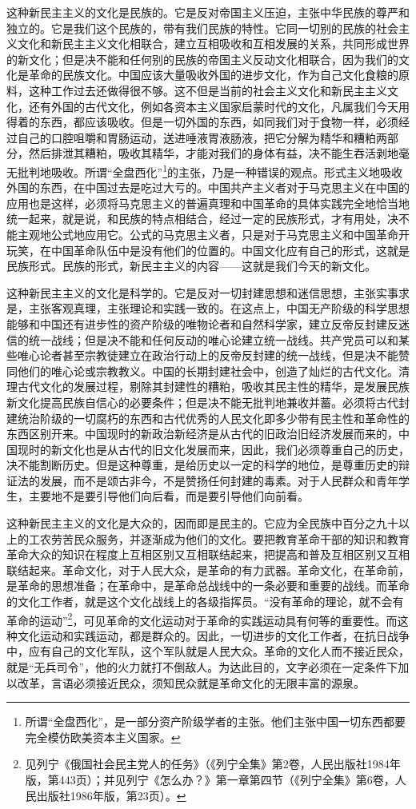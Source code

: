 \documentclass[UTF8, 12pt, a4paper]{ctexrep}
\begin{document}
这种新民主主义的文化是民族的。它是反对帝国主义压迫，主张中华民族的尊严和独立的。它是我们这个民族的，带有我们民族的特性。它同一切别的民族的社会主义文化和新民主主义文化相联合，建立互相吸收和互相发展的关系，共同形成世界的新文化；但是决不能和任何别的民族的帝国主义反动文化相联合，因为我们的文化是革命的民族文化。中国应该大量吸收外国的进步文化，作为自己文化食粮的原料，这种工作过去还做得很不够。这不但是当前的社会主义文化和新民主主义文化，还有外国的古代文化，例如各资本主义国家启蒙时代的文化，凡属我们今天用得着的东西，都应该吸收。但是一切外国的东西，如同我们对于食物一样，必须经过自己的口腔咀嚼和胃肠运动，送进唾液胃液肠液，把它分解为精华和糟粕两部分，然后排泄其糟粕，吸收其精华，才能对我们的身体有益，决不能生吞活剥地毫无批判地吸收。所谓“全盘西化”\footnote{所谓“全盘西化”，是一部分资产阶级学者的主张。他们主张中国一切东西都要完全模仿欧美资本主义国家。}的主张，乃是一种错误的观点。形式主义地吸收外国的东西，在中国过去是吃过大亏的。中国共产主义者对于马克思主义在中国的应用也是这样，必须将马克思主义的普遍真理和中国革命的具体实践完全地恰当地统一起来，就是说，和民族的特点相结合，经过一定的民族形式，才有用处，决不能主观地公式地应用它。公式的马克思主义者，只是对于马克思主义和中国革命开玩笑，在中国革命队伍中是没有他们的位置的。中国文化应有自己的形式，这就是民族形式。民族的形式，新民主主义的内容——这就是我们今天的新文化。

这种新民主主义的文化是科学的。它是反对一切封建思想和迷信思想，主张实事求是，主张客观真理，主张理论和实践一致的。在这点上，中国无产阶级的科学思想能够和中国还有进步性的资产阶级的唯物论者和自然科学家，建立反帝反封建反迷信的统一战线；但是决不能和任何反动的唯心论建立统一战线。共产党员可以和某些唯心论者甚至宗教徒建立在政治行动上的反帝反封建的统一战线，但是决不能赞同他们的唯心论或宗教教义。中国的长期封建社会中，创造了灿烂的古代文化。清理古代文化的发展过程，剔除其封建性的糟粕，吸收其民主性的精华，是发展民族新文化提高民族自信心的必要条件；但是决不能无批判地兼收并蓄。必须将古代封建统治阶级的一切腐朽的东西和古代优秀的人民文化即多少带有民主性和革命性的东西区别开来。中国现时的新政治新经济是从古代的旧政治旧经济发展而来的，中国现时的新文化也是从古代的旧文化发展而来，因此，我们必须尊重自己的历史，决不能割断历史。但是这种尊重，是给历史以一定的科学的地位，是尊重历史的辩证法的发展，而不是颂古非今，不是赞扬任何封建的毒素。对于人民群众和青年学生，主要地不是要引导他们向后看，而是要引导他们向前看。

这种新民主主义的文化是大众的，因而即是民主的。它应为全民族中百分之九十以上的工农劳苦民众服务，并逐渐成为他们的文化。要把教育革命干部的知识和教育革命大众的知识在程度上互相区别又互相联结起来，把提高和普及互相区别又互相联结起来。革命文化，对于人民大众，是革命的有力武器。革命文化，在革命前，是革命的思想准备；在革命中，是革命总战线中的一条必要和重要的战线。而革命的文化工作者，就是这个文化战线上的各级指挥员。“没有革命的理论，就不会有革命的运动”\footnote{见列宁《俄国社会民主党人的任务》（《列宁全集》第2卷，人民出版社1984年版，第443页）；并见列宁《怎么办？》第一章第四节（《列宁全集》第6卷，人民出版社1986年版，第23页）。}，可见革命的文化运动对于革命的实践运动具有何等的重要性。而这种文化运动和实践运动，都是群众的。因此，一切进步的文化工作者，在抗日战争中，应有自己的文化军队，这个军队就是人民大众。革命的文化人而不接近民众，就是“无兵司令”，他的火力就打不倒敌人。为达此目的，文字必须在一定条件下加以改革，言语必须接近民众，须知民众就是革命文化的无限丰富的源泉。
\end{document}

